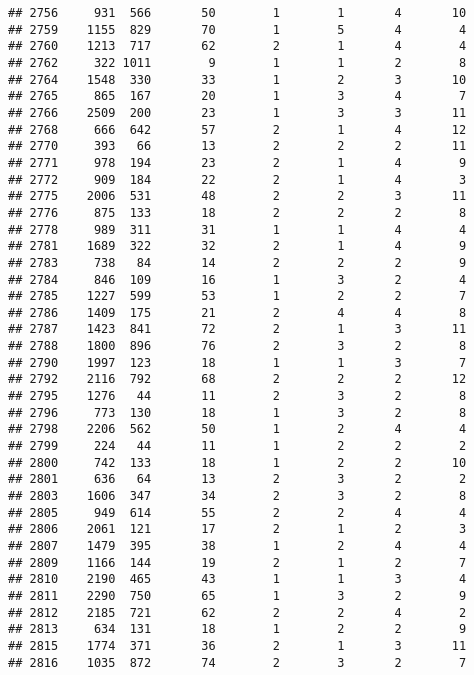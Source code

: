 \documentclass[]{article}
\begin{document}
\begin{verbatim}
## 2756     931  566       50        1        1       4       10
## 2759    1155  829       70        1        5       4        4
## 2760    1213  717       62        2        1       4        4
## 2762     322 1011        9        1        1       2        8
## 2764    1548  330       33        1        2       3       10
## 2765     865  167       20        1        3       4        7
## 2766    2509  200       23        1        3       3       11
## 2768     666  642       57        2        1       4       12
## 2770     393   66       13        2        2       2       11
## 2771     978  194       23        2        1       4        9
## 2772     909  184       22        2        1       4        3
## 2775    2006  531       48        2        2       3       11
## 2776     875  133       18        2        2       2        8
## 2778     989  311       31        1        1       4        4
## 2781    1689  322       32        2        1       4        9
## 2783     738   84       14        2        2       2        9
## 2784     846  109       16        1        3       2        4
## 2785    1227  599       53        1        2       2        7
## 2786    1409  175       21        2        4       4        8
## 2787    1423  841       72        2        1       3       11
## 2788    1800  896       76        2        3       2        8
## 2790    1997  123       18        1        1       3        7
## 2792    2116  792       68        2        2       2       12
## 2795    1276   44       11        2        3       2        8
## 2796     773  130       18        1        3       2        8
## 2798    2206  562       50        1        2       4        4
## 2799     224   44       11        1        2       2        2
## 2800     742  133       18        1        2       2       10
## 2801     636   64       13        2        3       2        2
## 2803    1606  347       34        2        3       2        8
## 2805     949  614       55        2        2       4        4
## 2806    2061  121       17        2        1       2        3
## 2807    1479  395       38        1        2       4        4
## 2809    1166  144       19        2        1       2        7
## 2810    2190  465       43        1        1       3        4
## 2811    2290  750       65        1        3       2        9
## 2812    2185  721       62        2        2       4        2
## 2813     634  131       18        1        2       2        9
## 2815    1774  371       36        2        1       3       11
## 2816    1035  872       74        2        3       2        7

\end{verbatim}
\end{document}
